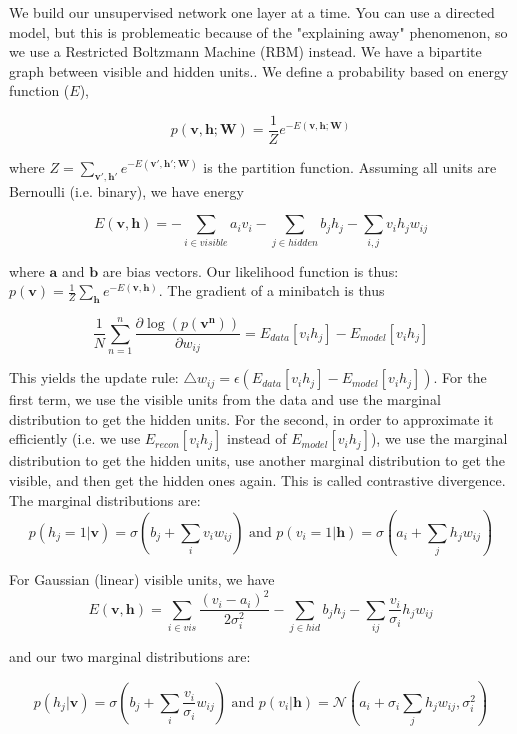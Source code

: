 \documentclass[a4paper]{article}
\begin{document}
We build our unsupervised network one layer at a time. You can use a directed
model, but this is problemeatic because of the "explaining away" phenomenon,
so we use a Restricted Boltzmann Machine (RBM) instead. We have a bipartite
graph between visible and hidden units.. We define a 
probability based on energy function ($E$), 

$$
p(\mathbf{v}, \mathbf{h};
\mathbf{W}) = \frac{1}{Z} e^{-E(\mathbf{v}, \mathbf{h}; \mathbf{W})}
$$

where $Z = \sum_{\mathbf{v}', \mathbf{h}'}{e^{-E(\mathbf{v}', \mathbf{h}';
\mathbf{W})}}$ is the partition function. Assuming all units are Bernoulli
(i.e. binary), we have energy

$$
E(\mathbf{v}, \mathbf{h}) = -
\sum_{i \in visible}{a_i v_i} - \sum_{j \in hidden}{b_j h_j} - \sum_{i,j}{
v_i h_j w_{ij}}
$$

where $\mathbf{a}$ and $\mathbf{b}$ are bias vectors. Our
likelihood function is thus: $p(\mathbf{v}) = \frac{1}{Z}
\sum_{\mathbf{h}}{e^{-E(\mathbf{v}, \mathbf{h})}}$. The gradient of a minibatch
is thus 

$$
\frac{1}{N} \sum_{n=1}^{n}{\frac{\partial \log(p(\mathbf{v^n}))}{
\partial w_{ij}}} = E_{data}[v_i h_j] - E_{model}[v_i h_j]
$$

This yields the update rule:
$\triangle w_{ij} = \epsilon(E_{data}[v_i h_j] - E_{model}[v_i h_j])$. For the
first term, we use the visible units from the data and use the marginal
distribution to get the hidden units. For the second, in order to approximate
it efficiently (i.e. we use $E_{recon}[v_i h_j]$ instead of
$E_{model}[v_i h_j]$), we use the marginal distribution to get the hidden
units, use another marginal distribution to get the visible, and then get the
hidden ones again. This is called contrastive divergence. The marginal
distributions are: 
$$
p(h_j = 1| \mathbf{v}) = \sigma(b_j + \sum_{i}{v_i w_{ij}}) \text{ and }
p(v_i = 1| \mathbf{h}) = \sigma(a_i + \sum_{j}{h_j w_{ij}})
$$

For Gaussian (linear) visible units, we have 
$$
E(\mathbf{v}, \mathbf{h}) =
\sum_{i \in vis}{\frac{(v_i - a_i)^2}{2 \sigma_i^2}} - 
\sum_{j \in hid}{b_j h_j} - \sum_{ij}{\frac{v_i}{\sigma_i} h_j w_{ij}}
$$

and our two marginal distributions are:

$$
p(h_j | \mathbf{v}) = \sigma(b_j + \sum_{i}{\frac{v_i}{\sigma_i} w_{ij}})
\text{ and }
p(v_i | \mathbf{h}) = \mathcal{N}(a_i + \sigma_i \sum_{j}{h_j w_{ij}}, 
\sigma_i^2)
$$
\end{document}
